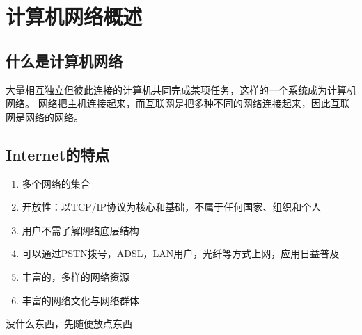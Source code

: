 \section{计算机网络概述}
\subsection{什么是计算机网络}
    大量相互独立但彼此连接的计算机共同完成某项任务，这样的一个系统成为计算机网络。    
    网络把主机连接起来，而互联网是把多种不同的网络连接起来，因此互联网是网络的网络。

\subsection{Internet的特点}
    \begin{enumerate}
        \item 多个网络的集合
        \item 开放性：以TCP/IP协议为核心和基础，不属于任何国家、组织和个人
        \item 用户不需了解网络底层结构
        \item 可以通过PSTN拨号，ADSL，LAN用户，光纤等方式上网，应用日益普及
        \item 丰富的，多样的网络资源
        \item 丰富的网络文化与网络群体
    \end{enumerate}

\begin{todobox}
    没什么东西，先随便放点东西
\end{todobox}